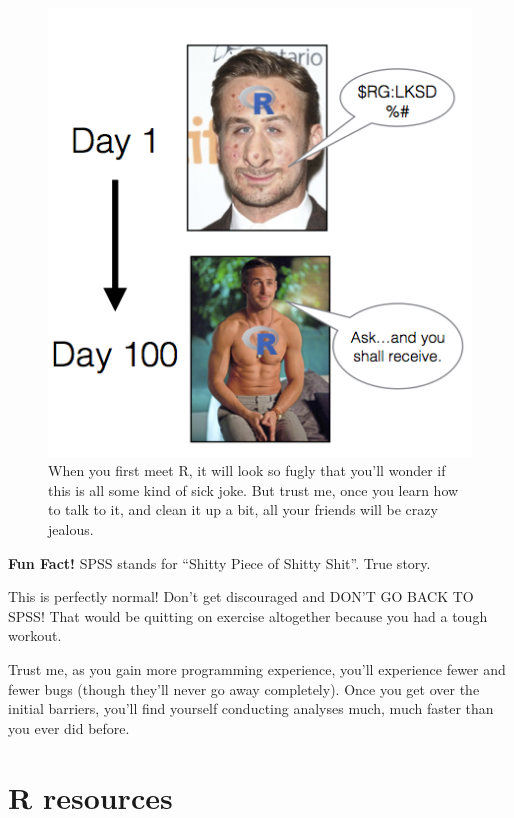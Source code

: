 \documentclass[]{book}
\theoremstyle{definition}
\theoremstyle{definition}
\theoremstyle{remark}
\begin{document}
\begin{figure}

{\centering \includegraphics[width=5.99in]{images/gosling} 

}

\caption{When you first meet R, it will look so fugly that you'll wonder if this is all some kind of sick joke. But trust me, once you learn how to talk to it, and clean it up a bit, all your friends will be crazy jealous.}\label{fig:unnamed-chunk-5}
\end{figure}

\textbf{Fun Fact!} SPSS stands for ``Shitty Piece of Shitty Shit''. True
story.

This is perfectly normal! Don't get discouraged and DON'T GO BACK TO
SPSS! That would be quitting on exercise altogether because you had a
tough workout.

Trust me, as you gain more programming experience, you'll experience
fewer and fewer bugs (though they'll never go away completely). Once you
get over the initial barriers, you'll find yourself conducting analyses
much, much faster than you ever did before.

\section{R resources}\label{r-resources}
\end{document}
